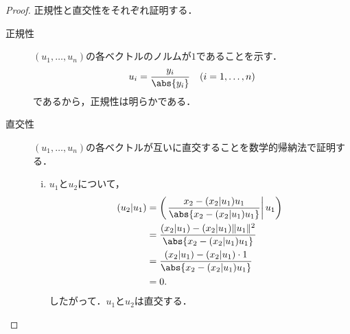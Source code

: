 \begin{tleftbar}
    \begin{proof}
        正規性と直交性をそれぞれ証明する．
        \begin{description}
            \item[正規性] $(u_1, \ldots, u_n)$の各ベクトルのノルムが$1$であることを示す．
                  \[
                      u_i = \frac{y_i}{\abs{y_i}} \quad (i = 1, \ldots, n)
                  \]
                  であるから，正規性は明らかである．
            \item[直交性] $(u_1, \ldots, u_n)$の各ベクトルが互いに直交することを数学的帰納法で証明する．
                  \begin{enumerate}[(i)]
                      \item $u_1$と$u_2$について，
                            \begin{align*}
                                (u_2 | u_1) & = \left(\left. \frac{x_2 - (x_2 | u_1) u_1}{\abs{ x_2 - (x_2 | u_1) u_1 }} \right|u_1 \right) \\
                                            & = \frac{(x_2 | u_1) - (x_2 | u_1) \|u_1\|^2}{\abs{ x_2 - (x_2 | u_1) u_1 }}                   \\
                                            & = \frac{(x_2 | u_1) - (x_2 | u_1) \cdot 1}{\abs{ x_2 - (x_2 | u_1) u_1 }}                     \\
                                            & = 0.
                            \end{align*}
                            したがって．$u_1$と$u_2$は直交する．


\end{enumerate}
\end{description}
\end{proof}
\end{tleftbar}
